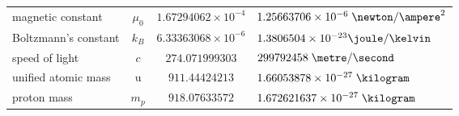 \begin{table}
\begin{center}
\begin{tabular*}{\textwidth}{p{}|c|c|c|l}
   magnetic constant &$\mu_0$&\multicolumn{2}{c|}{$1.67294062\times10^{-4}$}& $1.25663706\times10^{-6}\;\newton/\ampere^2$\\
   Boltzmann's constant & $k_B$ &\multicolumn{2}{c|}{$6.33363068\times10^{-6}$}&$1.3806504\times10^{-23}\joule/\kelvin$\\
   speed of light & $c$&\multicolumn{2}{c|}{$274.071999303$}&$299792458\;\metre/\second$\\
   unified atomic mass & $\textrm{u}$ & \multicolumn{2}{c|}{$911.44424213$} & $1.66053878\times{10}^{-27}\;\kilogram$\\
   proton mass & $m_p$ & \multicolumn{2}{c|}{$918.07633572$} &$1.672621637\times{10}^{-27}\;\kilogram$ \\
   \end{tabular*}
  \end{center}
\end{table}

